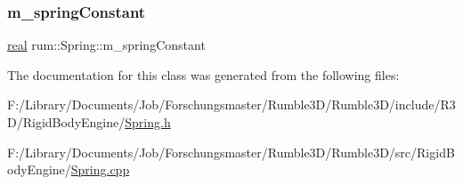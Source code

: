 \mbox{\label{classrum_1_1_spring_a820806622160bcdd02d756a1cabadc20}} 
\subsubsection{\texorpdfstring{m\+\_\+spring\+Constant}{m\_springConstant}}
{\footnotesize\ttfamily \hyperlink{namespacerum_a7e8cca23573d5eaead0f138cbaa4862c}{real} rum\+::\+Spring\+::m\+\_\+spring\+Constant\hspace{0.3cm}{\ttfamily [protected]}}



The documentation for this class was generated from the following files\+:\begin{DoxyCompactItemize}
\item 
F\+:/\+Library/\+Documents/\+Job/\+Forschungsmaster/\+Rumble3\+D/\+Rumble3\+D/include/\+R3\+D/\+Rigid\+Body\+Engine/\hyperlink{_spring_8h}{Spring.\+h}\item 
F\+:/\+Library/\+Documents/\+Job/\+Forschungsmaster/\+Rumble3\+D/\+Rumble3\+D/src/\+Rigid\+Body\+Engine/\hyperlink{_spring_8cpp}{Spring.\+cpp}\end{DoxyCompactItemize}
